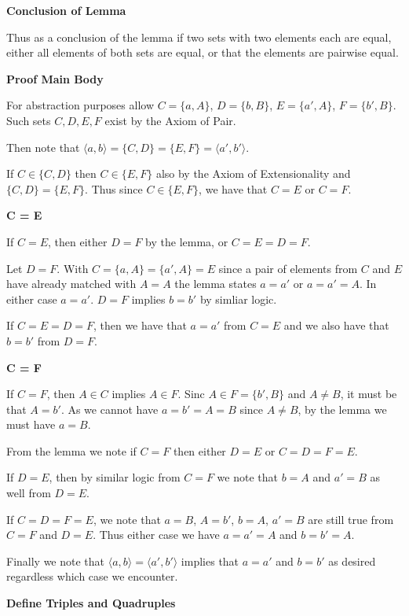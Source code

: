 \documentclass{article}
\begin{document}
\medskip
\textbf{Conclusion of Lemma}
\medskip

Thus as a conclusion of the lemma if two sets with two elements each are equal, either all elements of both sets are equal, or that the elements are pairwise equal.

\medskip
\textbf{Proof Main Body}
\medskip

For abstraction purposes allow $C = \{a, A\}$, $D = \{b, B\}$, $E = \{a', A\}$, $F = \{b', B\}$. Such sets $C,D,E,F$ exist by the Axiom of Pair.

\medskip

Then note that $\langle a,b \rangle = \{C, D\} = \{E, F\} = \langle a',b' \rangle$.

If $C \in \{C, D\}$ then $C \in \{E,F\}$ also by the Axiom of Extensionality and $\{C,D\} = \{E,F\}$. Thus since $C \in \{E,F\}$, we have that $C = E$ or $C = F$.

\newpage
\textbf{C = E}
\medskip

If $C = E$, then either $D = F$ by the lemma, or $C = E = D = F$.

\medskip
Let $D = F$. With $C = \{a, A\} = \{a', A\} = E$ since a pair of elements from $C$ and $E$ have already matched with $A = A$ the lemma states $a = a'$ or $a = a' = A$. In either case $a = a'$. $D = F$ implies $b = b'$ by simliar logic.

\medskip
If $C = E = D = F$, then we have that $a = a'$ from $C = E$ and we also have that $b = b'$ from $D = F$. 

\medskip
\textbf{C = F}
\medskip

If $C = F$, then $A \in C$ implies $A \in F$. Sinc $A \in F = \{b',B\}$ and $A \neq B$, it must be that $A = b'$. As we cannot have $a = b' = A = B$ since $A \neq B$, by the lemma we must have $a = B$. 

\medskip
From the lemma we note if $C = F$ then either $D = E$ or $C = D = F = E$.

\medskip
If $D = E$, then by similar logic from $C = F$ we note that $b = A$ and $a' = B$ as well from $D = E$.

\medskip
If $C = D = F = E$, we note that $a = B$, $A = b'$, $b = A$, $a' = B$ are still true from $C = F$ and $D = E$. Thus either case we have $a = a' = A$ and $b = b' = A$.

\bigskip
Finally we note that $\langle a,b \rangle = \langle a',b' \rangle$ implies that $a = a'$ and $b = b'$ as desired regardless which case we encounter.


\bigskip
\textbf{Define Triples and Quadruples}
\medskip
\end{document}
